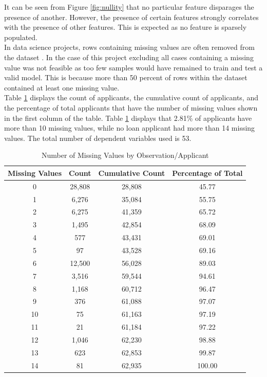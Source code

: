 \vspace{10pt}

It can be seen from Figure \ref{fig:nullity} that no particular feature disparages the presence of another. However, the presence of certain features strongly correlates with the presence of other features. This is expected as no feature is sparsely populated. \\

 In data science projects, rows containing missing values are often removed from the dataset \parencite{MissingValues}. In the case of this project excluding all cases containing a missing value was not feasible as too few samples would have remained to train and test a valid model. This is because more than 50 percent of rows within the dataset contained at least one missing value. \\
 
 Table \ref{table:missing_row} displays the count of applicants, the cumulative count of applicants, and the percentage of total applicants that have the number of missing values shown in the first column of the table. Table \ref{table:missing_row} displays that 2.81\% of applicants have more than 10 missing values, while no loan applicant had more than 14 missing values. The total number of dependent variables used is 53.   
 
\vspace{10pt}

\begin{table}[H]
\begin{center}
\begin{tabular}{|c|c|c|c|} 
\hline
\multicolumn{1}{|c|}{Missing Values}
&\multicolumn{1}{|c|}{Count}
&\multicolumn{1}{|c|}{Cumulative Count}
&\multicolumn{1}{|c|}{Percentage of Total}\\
\hline
0 & 28,808 & 28,808  & 45.77  \\
\hline
1 & 6,276 & 35,084 & 55.75  \\
\hline
2 & 6,275 & 41,359 & 65.72 \\
\hline
3 & 1,495 & 42,854 & 68.09 \\
\hline
4 & 577 & 43,431 & 69.01 \\
\hline
5 & 97 & 43,528 & 69.16 \\
\hline
6 & 12,500 & 56,028 & 89.03 \\
\hline
7 & 3,516 & 59,544 & 94.61 \\
\hline
8 & 1,168 & 60,712 & 96.47 \\
\hline
9 & 376 & 61,088 & 97.07\\
\hline
10 & 75 & 61,163 & 97.19\\
\hline
11 & 21 & 61,184 & 97.22\\
\hline
12 & 1,046 & 62,230 & 98.88\\
\hline
13 & 623 & 62,853 & 99.87\\
\hline
14 & 81 & 62,935 & 100.00\\
\hline
\end{tabular}
\end{center}
\caption{Number of Missing Values by Observation/Applicant}
\label{table:missing_row}
\end{table}

